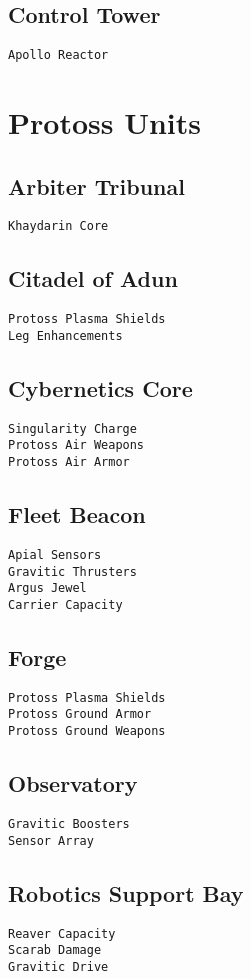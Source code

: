 \subsection{Control Tower}
\verb|Apollo Reactor|

\section{Protoss Units}

\subsection{Arbiter Tribunal}
\verb|Khaydarin Core|

\subsection{Citadel of Adun}
\verb|Protoss Plasma Shields|\\
\verb|Leg Enhancements|

\subsection{Cybernetics Core}
\verb|Singularity Charge|\\
\verb|Protoss Air Weapons|\\
\verb|Protoss Air Armor|

\subsection{Fleet Beacon}
\verb|Apial Sensors|\\
\verb|Gravitic Thrusters| \\
\verb|Argus Jewel|\\
\verb|Carrier Capacity|

\subsection{Forge}
\verb|Protoss Plasma Shields|\\
\verb|Protoss Ground Armor|\\
\verb|Protoss Ground Weapons|

\subsection{Observatory}
\verb|Gravitic Boosters|\\
\verb|Sensor Array|

\subsection{Robotics Support Bay}
\verb|Reaver Capacity|\\
\verb|Scarab Damage|\\
\verb|Gravitic Drive|

